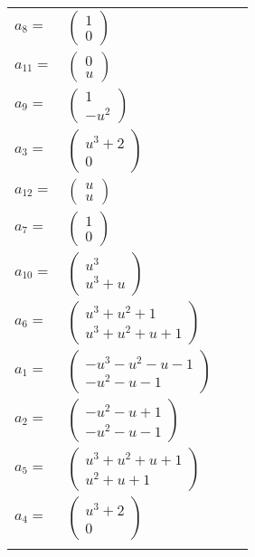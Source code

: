 \documentclass[1p]{elsarticle_modified}
\theoremstyle{definition}
\begin{document}
\begin{tabular}{m{7pt} m{180pt} m{7pt} m{180pt} }
\flushright $a_{8}=$&$\begin{pmatrix}1\\0\end{pmatrix}$ \\
\flushright $a_{11}=$&$\begin{pmatrix}0\\u\end{pmatrix}$ \\
\flushright $a_{9}=$&$\begin{pmatrix}1\\- u^2\end{pmatrix}$ \\
\flushright $a_{3}=$&$\begin{pmatrix}u^3+2\\0\end{pmatrix}$ \\
\flushright $a_{12}=$&$\begin{pmatrix}u\\u\end{pmatrix}$ \\
\flushright $a_{7}=$&$\begin{pmatrix}1\\0\end{pmatrix}$ \\
\flushright $a_{10}=$&$\begin{pmatrix}u^3\\u^3+u\end{pmatrix}$ \\
\flushright $a_{6}=$&$\begin{pmatrix}u^3+u^2+1\\u^3+u^2+u+1\end{pmatrix}$ \\
\flushright $a_{1}=$&$\begin{pmatrix}- u^3- u^2- u-1\\- u^2- u-1\end{pmatrix}$ \\
\flushright $a_{2}=$&$\begin{pmatrix}- u^2- u+1\\- u^2- u-1\end{pmatrix}$ \\
\flushright $a_{5}=$&$\begin{pmatrix}u^3+u^2+u+1\\u^2+u+1\end{pmatrix}$ \\
\flushright $a_{4}=$&$\begin{pmatrix}u^3+2\\0\end{pmatrix}$\\&\end{tabular}
\end{document}
